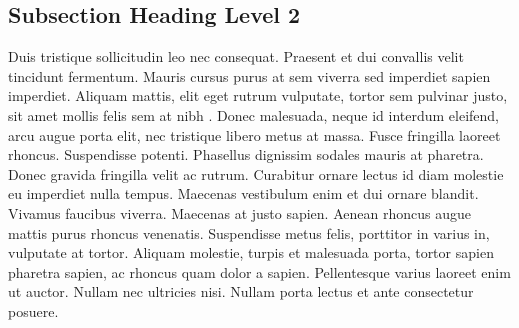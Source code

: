 \subsection{Subsection Heading Level 2}%
Duis tristique  sollicitudin leo nec consequat. Praesent et dui convallis velit tincidunt fermentum. Mauris cursus purus at sem viverra sed imperdiet sapien imperdiet. Aliquam mattis, elit eget rutrum vulputate, tortor sem pulvinar justo, sit amet mollis felis sem at nibh \cite{Bontempi2005Adaptive}. Donec malesuada, neque id interdum eleifend, arcu augue porta elit, nec tristique libero metus at massa. Fusce fringilla laoreet rhoncus. Suspendisse potenti. Phasellus dignissim sodales mauris at pharetra. Donec gravida fringilla velit ac rutrum. Curabitur ornare lectus id diam molestie eu imperdiet nulla tempus. Maecenas vestibulum enim et dui ornare blandit. Vivamus  faucibus viverra. Maecenas at justo sapien. Aenean rhoncus augue mattis purus rhoncus venenatis. Suspendisse metus felis, porttitor in varius in, vulputate at tortor. Aliquam molestie, turpis et malesuada porta, tortor sapien pharetra sapien, ac rhoncus quam dolor a sapien. Pellentesque varius laoreet enim ut auctor. Nullam nec ultricies nisi. Nullam porta lectus et ante consectetur posuere. 
